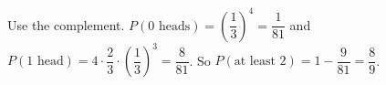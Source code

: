 Use the complement. $P(0\text{ heads})=\left(\dfrac{1}{3}\right)^4=\dfrac{1}{81}$ and $P(1\text{ head})=4\cdot\dfrac{2}{3}\cdot\left(\dfrac{1}{3}\right)^3=\dfrac{8}{81}$. So $P(\text{at least }2)=1-\dfrac{9}{81}=\boxed{\dfrac{8}{9}}$.

